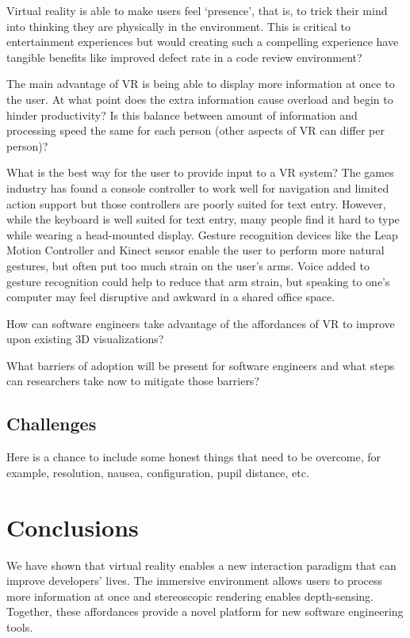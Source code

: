 \documentclass[conference]{IEEEtran}
\begin{document}
Virtual reality is able to make users feel `presence', that is, to trick their mind into thinking they are physically in the environment. 
This is critical to entertainment experiences but would creating such a compelling experience have tangible benefits like improved defect rate in a code review environment? 

The main advantage of VR is being able to display more information at once to the user.  
At what point does the extra information cause overload and begin to hinder productivity?  
Is this balance between amount of information and processing speed the same for each person (other aspects of VR can differ per person)?


What is the best way for the user to provide input to a VR system? 
The games industry has found a console controller to work well for navigation and limited action support but those controllers are poorly suited for text entry. 
However, while the keyboard is well suited for text entry, many people find it hard to type while wearing a head-mounted display. 
Gesture recognition devices like the Leap Motion Controller and Kinect sensor enable the user to perform more natural gestures, but often put too much strain on the user's arms. 
Voice added to gesture recognition could help to reduce that arm strain, but speaking to one's computer may feel disruptive and awkward in a shared office space.

How can software engineers take advantage of the affordances of VR to improve upon existing 3D visualizations?

What barriers of adoption will be present for software engineers and what steps can researchers take now to mitigate those barriers?

\subsection{Challenges}
Here is a chance to include some honest things that need to be overcome, for example, resolution, nausea, configuration, pupil distance, etc.

\section{Conclusions}
We have shown that virtual reality enables a new interaction paradigm that can improve developers' lives. 
The immersive environment allows users to process more information at once and stereoscopic rendering enables depth-sensing. 
Together, these affordances provide a novel platform for new software engineering tools.



\end{document}
